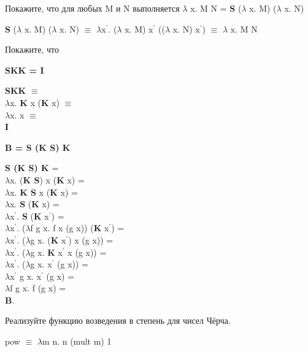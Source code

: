 \documentclass[a4paper,12pt]{article} %
\begin{document}
\begin{enumerate}
\begin{enumerate}
\end{enumerate}

{\item Покажите, что для любых M и N выполняется $\lambda$ x. M N = \textbf{S} ($\lambda$ x. M) ($\lambda$ x. N)}

\textbf{S} ($\lambda$ x. M) ($\lambda$ x. N) $\equiv$ $\lambda$x$^\prime$. ($\lambda$ x. M) x$^\prime$ (($\lambda$ x. N) x$^\prime$) $\equiv$ $\lambda$ x. M N

\newpage

{\item Покажите, что}

\begin{enumerate}

{\item \textbf{SKK = I}}

\textbf{SKK} $\equiv$ \\
$\lambda$x. \textbf{K} x (\textbf{K} x) $\equiv$ \\
$\lambda$x. x $\equiv$ \\
\textbf{I}


{\item \textbf{B = S (K S) K}}

\textbf{S (K S) K} = \\
$\lambda$x. (\textbf{K S}) x (\textbf{K} x) = \\
$\lambda$x. \textbf{K S} x (\textbf{K} x) = \\
$\lambda$x. \textbf{S} (\textbf{K} x) = \\
$\lambda$x$^\prime$. \textbf{S} (\textbf{K} x$^\prime$) = \\
$\lambda$x$^\prime$. ($\lambda$f g x. f x (g x)) (\textbf{K} x$^\prime$) = \\
$\lambda$x$^\prime$. ($\lambda$g x. (\textbf{K} x$^\prime$) x (g x))  = \\
$\lambda$x$^\prime$. ($\lambda$g x. \textbf{K} x$^\prime$ x (g x))  = \\
$\lambda$x$^\prime$. ($\lambda$g x. x$^\prime$ (g x))  = \\
$\lambda$x$^\prime$ g x. x$^\prime$ (g x) = \\
$\lambda$f g x. f (g x) = \\
\textbf{B}.

\end{enumerate}

{\item Реализуйте функцию возведения в степень для чисел Чёрча.}

pow $\equiv$ $\lambda$m n. n (mult m) 1

\end{enumerate}
\end{document}

